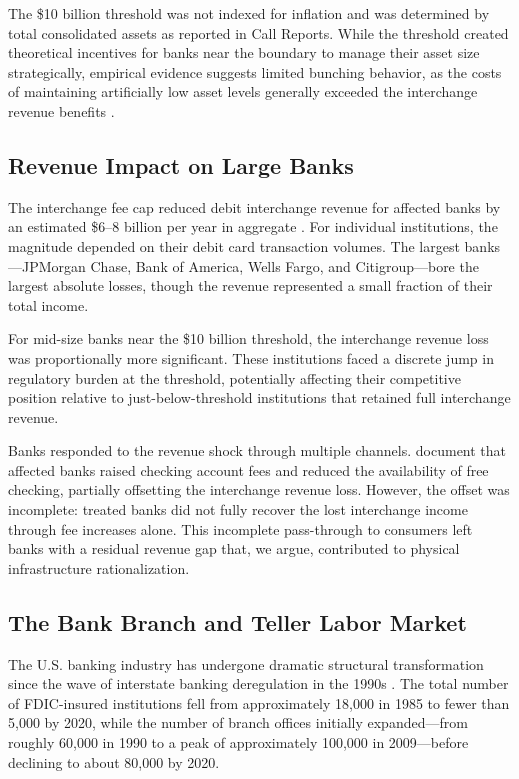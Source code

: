 \documentclass[12pt]{article}
\begin{document}
The \$10 billion threshold was not indexed for inflation and was determined by total consolidated assets as reported in Call Reports. While the threshold created theoretical incentives for banks near the boundary to manage their asset size strategically, empirical evidence suggests limited bunching behavior, as the costs of maintaining artificially low asset levels generally exceeded the interchange revenue benefits \citep{kay2014}.

\subsection{Revenue Impact on Large Banks}

The interchange fee cap reduced debit interchange revenue for affected banks by an estimated \$6--8 billion per year in aggregate \citep{hayashi2012}. For individual institutions, the magnitude depended on their debit card transaction volumes. The largest banks---JPMorgan Chase, Bank of America, Wells Fargo, and Citigroup---bore the largest absolute losses, though the revenue represented a small fraction of their total income.

For mid-size banks near the \$10 billion threshold, the interchange revenue loss was proportionally more significant. These institutions faced a discrete jump in regulatory burden at the threshold, potentially affecting their competitive position relative to just-below-threshold institutions that retained full interchange revenue.

Banks responded to the revenue shock through multiple channels. \citet{kay2014} document that affected banks raised checking account fees and reduced the availability of free checking, partially offsetting the interchange revenue loss. However, the offset was incomplete: treated banks did not fully recover the lost interchange income through fee increases alone. This incomplete pass-through to consumers left banks with a residual revenue gap that, we argue, contributed to physical infrastructure rationalization.

\subsection{The Bank Branch and Teller Labor Market}

The U.S. banking industry has undergone dramatic structural transformation since the wave of interstate banking deregulation in the 1990s \citep{jayaratne1996, kroszner1999}. The total number of FDIC-insured institutions fell from approximately 18,000 in 1985 to fewer than 5,000 by 2020, while the number of branch offices initially expanded---from roughly 60,000 in 1990 to a peak of approximately 100,000 in 2009---before declining to about 80,000 by 2020.
\end{document}

